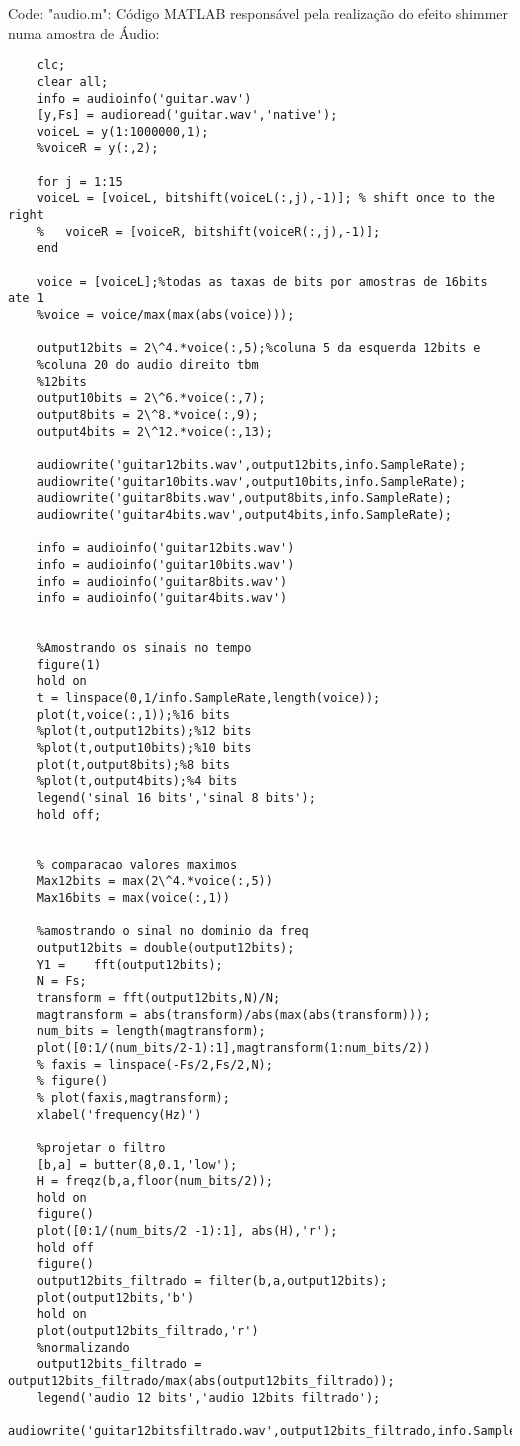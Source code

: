 Code: "audio.m": Código MATLAB responsável pela realização do efeito shimmer numa amostra de Áudio:
\begin{lstlisting}
	clc;
	clear all;
	info = audioinfo('guitar.wav')
	[y,Fs] = audioread('guitar.wav','native');
	voiceL = y(1:1000000,1);
	%voiceR = y(:,2);
	
	for j = 1:15
	voiceL = [voiceL, bitshift(voiceL(:,j),-1)]; % shift once to the right
	%   voiceR = [voiceR, bitshift(voiceR(:,j),-1)];
	end
	
	voice = [voiceL];%todas as taxas de bits por amostras de 16bits ate 1
	%voice = voice/max(max(abs(voice)));
	
	output12bits = 2\^4.*voice(:,5);%coluna 5 da esquerda 12bits e 
	%coluna 20 do audio direito tbm
	%12bits
	output10bits = 2\^6.*voice(:,7);
	output8bits = 2\^8.*voice(:,9);
	output4bits = 2\^12.*voice(:,13);
	
	audiowrite('guitar12bits.wav',output12bits,info.SampleRate);
	audiowrite('guitar10bits.wav',output10bits,info.SampleRate);
	audiowrite('guitar8bits.wav',output8bits,info.SampleRate);
	audiowrite('guitar4bits.wav',output4bits,info.SampleRate);
	
	info = audioinfo('guitar12bits.wav')
	info = audioinfo('guitar10bits.wav')
	info = audioinfo('guitar8bits.wav')
	info = audioinfo('guitar4bits.wav')
	
	
	%Amostrando os sinais no tempo
	figure(1)
	hold on
	t = linspace(0,1/info.SampleRate,length(voice));
	plot(t,voice(:,1));%16 bits
	%plot(t,output12bits);%12 bits
	%plot(t,output10bits);%10 bits
	plot(t,output8bits);%8 bits
	%plot(t,output4bits);%4 bits
	legend('sinal 16 bits','sinal 8 bits');
	hold off;
	
	
	% comparacao valores maximos
	Max12bits = max(2\^4.*voice(:,5))
	Max16bits = max(voice(:,1))
	
	%amostrando o sinal no dominio da freq
	output12bits = double(output12bits);
	Y1 =    fft(output12bits);
	N = Fs;
	transform = fft(output12bits,N)/N;
	magtransform = abs(transform)/abs(max(abs(transform)));
	num_bits = length(magtransform);
	plot([0:1/(num_bits/2-1):1],magtransform(1:num_bits/2))
	% faxis = linspace(-Fs/2,Fs/2,N);
	% figure()
	% plot(faxis,magtransform);
	xlabel('frequency(Hz)')
	
	%projetar o filtro
	[b,a] = butter(8,0.1,'low');
	H = freqz(b,a,floor(num_bits/2));
	hold on
	figure()
	plot([0:1/(num_bits/2 -1):1], abs(H),'r');
	hold off
	figure()
	output12bits_filtrado = filter(b,a,output12bits);
	plot(output12bits,'b')
	hold on
	plot(output12bits_filtrado,'r')
	%normalizando
	output12bits_filtrado = output12bits_filtrado/max(abs(output12bits_filtrado));
	legend('audio 12 bits','audio 12bits filtrado');
	audiowrite('guitar12bitsfiltrado.wav',output12bits_filtrado,info.SampleRate);
	

\end{lstlisting}
